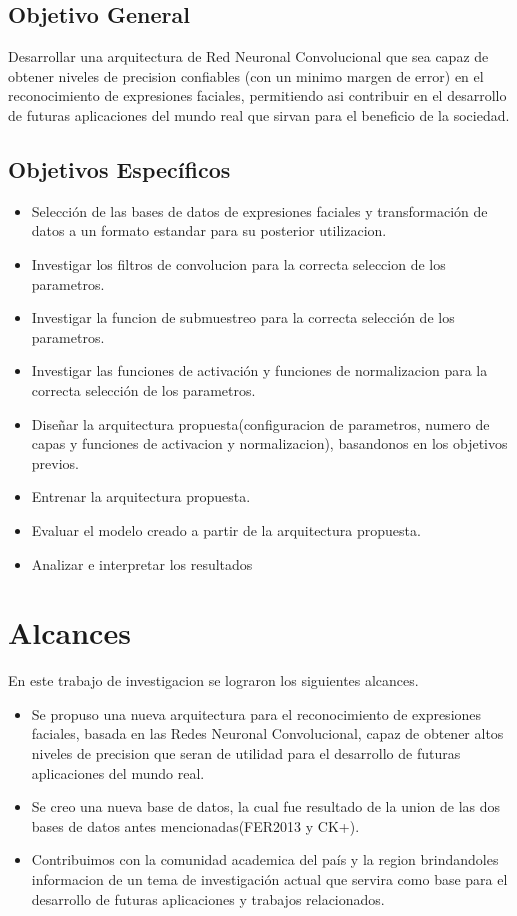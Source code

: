 \subsection{Objetivo General}
Desarrollar una arquitectura de Red Neuronal Convolucional que sea capaz de obtener niveles de precision confiables (con un minimo margen de error) en el reconocimiento de expresiones faciales, permitiendo asi contribuir en el desarrollo de futuras aplicaciones del mundo real que sirvan para el beneficio de la sociedad.
\subsection{Objetivos Específicos}
\begin{itemize}
\item Selección de las bases de datos de expresiones faciales y transformación de datos a un formato estandar para su posterior utilizacion.
\item Investigar los filtros de convolucion para la correcta seleccion de los parametros.
\item Investigar la funcion de submuestreo para la correcta selección de los parametros. 
\item Investigar las funciones de activación y funciones de normalizacion para la correcta selección de los parametros.
\item Diseñar la arquitectura propuesta(configuracion de parametros, numero de capas y funciones de activacion y normalizacion), basandonos en los objetivos previos.
\item Entrenar la arquitectura propuesta.	
\item Evaluar el modelo creado a partir de la arquitectura propuesta.
\item Analizar e interpretar los resultados
\end{itemize}

\section{Alcances}
En este trabajo de investigacion se lograron los siguientes alcances.

\begin{itemize}
\item Se propuso una nueva arquitectura para el reconocimiento de expresiones faciales, basada en las Redes Neuronal Convolucional, capaz de obtener altos niveles de precision que seran de utilidad para el desarrollo de futuras aplicaciones del mundo real.
\item Se creo una nueva base de datos, la cual fue resultado de la union de las dos bases de datos antes mencionadas(FER2013 y CK+).
\item Contribuimos con la comunidad academica del país y la region brindandoles informacion de un tema de investigación actual que servira como base para el desarrollo de futuras aplicaciones y trabajos relacionados.
\end{itemize}
 

